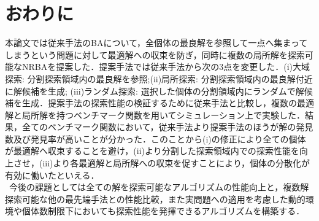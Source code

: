 \documentclass{jarticle}
\begin{document}
\section{おわりに}
本論文では従来手法のBAについて，全個体の最良解を参照して一点へ集まってしまうという問題に対して最適解への収束を防ぎ，同時に複数の局所解を探索可能なNRBAを提案した．提案手法では従来手法から次の3点を変更した．(i)大域探索: 分割探索領域内の最良解を参照;(ii)局所探索: 分割探索領域内の最良解付近に解候補を生成; (iii)ランダム探索: 選択した個体の分割領域内にランダムで解候補を生成．提案手法の探索性能の検証するために従来手法と比較し，複数の最適解と局所解を持つベンチマーク関数を用いてシミュレーション上で実験した．結果，全てのベンチマーク関数において，従来手法より提案手法のほうが解の発見数及び発見率が高いことが分かった．このことから(i)の修正により全ての個体が最適解へ収束することを避け，(ii)より分割した探索領域内での探索性能を向上させ，(iii)より各最適解と局所解への収束を促すことにより，個体の分散化が有効に働いたといえる．\\ \
今後の課題としては全ての解を探索可能なアルゴリズムの性能向上と，複数解探索可能な他の最先端手法との性能比較，また実問題への適用を考慮した動的環境や個体数制限下においても探索性能を発揮できるアルゴリズムを構築する．








\end{document}

